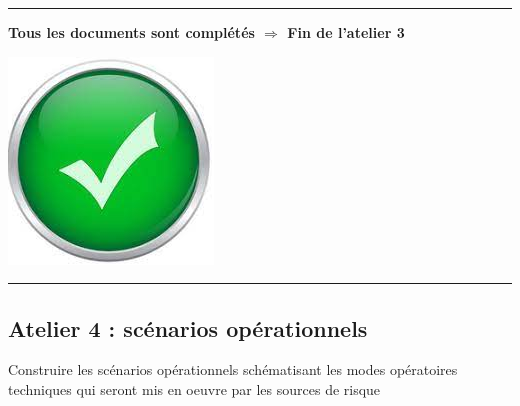 \documentclass[french, 12pt]{article}%
\newcommand{\titreencadre}{Titre}
\newenvironment{encadre}[1]{\renewcommand{\titreencadre}{#1}
	\begin{mdframed}[style=encadrestyle]
	\vspace{0.5\baselineskip}
	}{%
	\end{mdframed}}
\begin{document}
\vspace{0.5cm}
\begin{center}
 \rule{0.75\linewidth}{1pt}
\end{center}
\begin{minipage}[c]{0.59\linewidth}

\textbf{Tous les documents sont complétés $\Rightarrow$ Fin de l'atelier 3}
\end{minipage}
\begin{minipage}[c]{0.4\linewidth}
\begin{center}
\includegraphics[scale=0.1]{./ressource/OKLogo}
\end{center}
\end{minipage}
\begin{center}
 \rule{0.75\linewidth}{1pt}
\end{center}









\subsection{Atelier 4 : scénarios opérationnels}
\begin{encadre}{Objectif}
Construire les scénarios opérationnels schématisant les modes opératoires techniques qui  seront mis en oeuvre par les sources de risque
\end{encadre}
\end{document}
